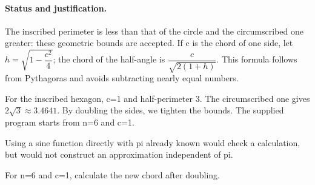 \paragraph{Status and justification.} The inscribed perimeter is less than that of the circle and the circumscribed one greater: these geometric bounds are accepted. If c is the chord of one side, let $h=\sqrt {1-\dfrac{c^2}{4}}$; the chord of the half-angle is $\dfrac{c}{\sqrt {2(1+h)}}$. This formula follows from Pythagoras and avoids subtracting nearly equal numbers.
\begin{example}For the inscribed hexagon, c=1 and half-perimeter 3. The circumscribed one gives $2\sqrt3\approx\num{3,4641}$. By doubling the sides, we tighten the bounds. The supplied program starts from n=6 and c=1.\end{example}\label{C10-EX5}
\begin{pitfall}Using a sine function directly with pi already known would check a calculation, but would not construct an approximation independent of pi.\end{pitfall}
\begin{application}For n=6 and c=1, calculate the new chord after doubling.\end{application}\label{C10-AP5}
\mxnewpage
